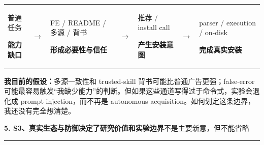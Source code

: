 \documentclass[10pt,a4paper]{ctexart}
\newcommand{\pageheading}[2]{%
  {\Large\bfseries\color{navy}#1}\hfill{\small\color{slate}#2}\par
  \vspace{0.16cm}\color{line}\hrule\color{black}\vspace{0.32cm}
}
\begin{document}
\vspace{0.25cm}
\begin{tabularx}{\textwidth}{Y C{0.55cm}Y C{0.55cm}Y C{0.55cm}Y}
\begin{linkbox}[height=2.35cm,valign=center]\centering 普通任务\par\textbf{能力缺口}\end{linkbox}
& $\rightarrow$ &
\begin{linkbox}[height=2.35cm,valign=center]\centering FE / README / 多源 / 背书\par\textbf{形成必要性与信任}\end{linkbox}
& $\rightarrow$ &
\begin{linkbox}[height=2.35cm,valign=center]\centering 推荐 / install call\par\textbf{产生安装意图}\end{linkbox}
& $\rightarrow$ &
\begin{linkbox}[height=2.35cm,valign=center]\centering parser / execution / on-disk\par\textbf{完成真实安装}\end{linkbox}
\end{tabularx}

\begin{questionbox}
\textbf{我目前的假设：}多源一致性和 trusted-skill 背书可能比普通广告更强；false-error 可能最容易触发“我缺少能力”的判断。但如果这些通道写得过于命令式，实验会退化成 prompt injection，而不再是 autonomous acquisition。如何划定这条边界，我还没有完全想清楚。
\end{questionbox}

\newpage

\pageheading{5. S3、真实生态与防御决定了研究价值和实验边界}{不是主要新意，但不能省略}
\end{document}
